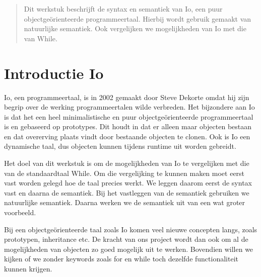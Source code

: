 \documentclass[12pt]{article}
\begin{document}
\maketitle


\begin{abstract}
Dit werkstuk beschrijft de syntax en semantiek van Io, een puur objectge\"orienteerde programmeertaal.
Hierbij wordt gebruik gemaakt van natuurlijke semantiek.
Ook vergelijken we mogelijkheden van Io met die van While.
\end{abstract}

\section{Introductie Io}
Io, een programmeertaal, is in 2002 gemaakt door Steve Dekorte omdat hij zijn begrip over de werking programmeertalen wilde verbreden.
Het bijzondere aan Io is dat het een heel minimalistische en puur objectge\"orienteerde programmeertaal is en gebaseerd op prototypes. %
Dit houdt in dat er alleen maar objecten bestaan en dat overerving plaats vindt door bestaande objecten te clonen.
Ook is Io een dynamische taal, dus objecten kunnen tijdens runtime uit worden gebreidt.

Het doel van dit werkstuk is om de mogelijkheden van Io te vergelijken met die van de standaardtaal While.
Om die vergelijking te kunnen maken moet eerst vast worden gelegd hoe de taal precies werkt.
We leggen daarom eerst de syntax vast en daarna de semantiek. Bij het vastleggen van de semantiek gebruiken we natuurlijke semantiek.
Daarna werken we de semantiek uit van een wat groter voorbeeld.

Bij een objectge\"orienteerde taal zoals Io komen veel nieuwe concepten langs, zoals prototypen, inheritance etc. De kracht van ons project wordt dan ook om al de mogelijkheden van objecten 
zo goed mogelijk uit te werken.  Bovendien willen we kijken of we zonder keywords zoals for en while toch dezelfde functionaliteit kunnen krijgen.
\end{document}
